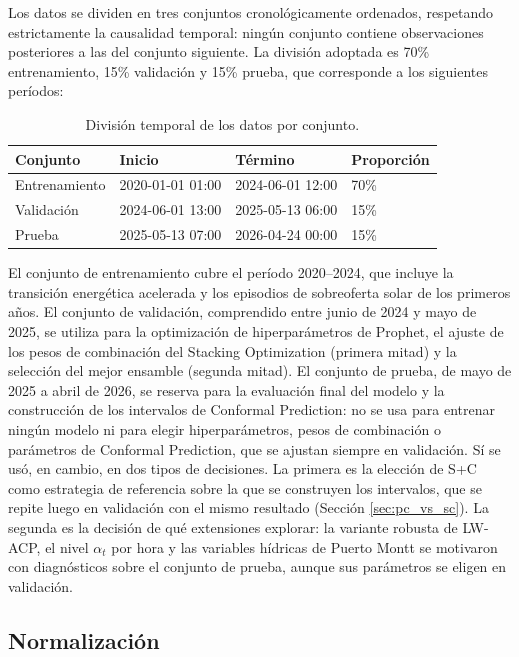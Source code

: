 Los datos se dividen en tres conjuntos cronológicamente ordenados, respetando estrictamente la causalidad temporal: ningún conjunto contiene observaciones posteriores a las del conjunto siguiente. La división adoptada es 70\% entrenamiento, 15\% validación y 15\% prueba, que corresponde a los siguientes períodos:

\begin{table}[htbp]
    \centering
    \begin{tabular}{llll}
        \toprule
        Conjunto & Inicio & Término & Proporción \\
        \midrule
        Entrenamiento & 2020-01-01 01:00 & 2024-06-01 12:00 & 70\% \\
        Validación    & 2024-06-01 13:00 & 2025-05-13 06:00 & 15\% \\
        Prueba        & 2025-05-13 07:00 & 2026-04-24 00:00 & 15\% \\
        \bottomrule
    \end{tabular}
    \caption{División temporal de los datos por conjunto.}
    \label{tab:division}
\end{table}

El conjunto de entrenamiento cubre el período 2020--2024, que incluye la transición energética acelerada y los episodios de sobreoferta solar de los primeros años. El conjunto de validación, comprendido entre junio de 2024 y mayo de 2025, se utiliza para la optimización de hiperparámetros de Prophet, el ajuste de los pesos de combinación del Stacking Optimization (primera mitad) y la selección del mejor ensamble (segunda mitad). El conjunto de prueba, de mayo de 2025 a abril de 2026, se reserva para la evaluación final del modelo y la construcción de los intervalos de Conformal Prediction: no se usa para entrenar ningún modelo ni para elegir hiperparámetros, pesos de combinación o parámetros de Conformal Prediction, que se ajustan siempre en validación. Sí se usó, en cambio, en dos tipos de decisiones. La primera es la elección de S+C como estrategia de referencia sobre la que se construyen los intervalos, que se repite luego en validación con el mismo resultado (Sección \ref{sec:pc_vs_sc}). La segunda es la decisión de qué extensiones explorar: la variante robusta de LW-ACP, el nivel $\alpha_t$ por hora y las variables hídricas de Puerto Montt se motivaron con diagnósticos sobre el conjunto de prueba, aunque sus parámetros se eligen en validación.

\subsection{Normalización}

